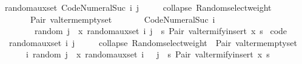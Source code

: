 \begin{isabellebody}
{\isacharbar}{\kern0pt}\ {\isachardoublequoteopen}random{\isacharunderscore}{\kern0pt}aux{\isacharunderscore}{\kern0pt}set\ {\isacharparenleft}{\kern0pt}Code{\isacharunderscore}{\kern0pt}Numeral{\isachardot}{\kern0pt}Suc\ i{\isacharparenright}{\kern0pt}\ j\ {\isacharequal}{\kern0pt}\isanewline
\ \ \ \ collapse\ {\isacharparenleft}{\kern0pt}Random{\isachardot}{\kern0pt}select{\isacharunderscore}{\kern0pt}weight\isanewline
\ \ \ \ \ \ {\isacharbrackleft}{\kern0pt}{\isacharparenleft}{\kern0pt}{}{\isacharcomma}{\kern0pt}\ Pair\ valterm{\isacharunderscore}{\kern0pt}emptyset{\isacharparenright}{\kern0pt}{\isacharcomma}{\kern0pt}\isanewline
\ \ \ \ \ \ \ {\isacharparenleft}{\kern0pt}Code{\isacharunderscore}{\kern0pt}Numeral{\isachardot}{\kern0pt}Suc\ i{\isacharcomma}{\kern0pt}\isanewline
\ \ \ \ \ \ \ \ random\ j\ {\isasymcirc}{\isasymrightarrow}\ {\isacharparenleft}{\kern0pt}{\isacharpercent}{\kern0pt}x{\isachardot}{\kern0pt}\ random{\isacharunderscore}{\kern0pt}aux{\isacharunderscore}{\kern0pt}set\ i\ j\ {\isasymcirc}{\isasymrightarrow}\ {\isacharparenleft}{\kern0pt}{\isacharpercent}{\kern0pt}s{\isachardot}{\kern0pt}\ Pair\ {\isacharparenleft}{\kern0pt}valtermify{\isacharunderscore}{\kern0pt}insert\ x\ s{\isacharparenright}{\kern0pt}{\isacharparenright}{\kern0pt}{\isacharparenright}{\kern0pt}{\isacharparenright}{\kern0pt}{\isacharbrackright}{\kern0pt}{\isacharparenright}{\kern0pt}{\isachardoublequoteclose}\isanewline
\isanewline
{}\isamarkupfalse%
\ {\isacharbrackleft}{\kern0pt}code{\isacharbrackright}{\kern0pt}{\isacharcolon}{\kern0pt}\isanewline
\ \ {\isachardoublequoteopen}random{\isacharunderscore}{\kern0pt}aux{\isacharunderscore}{\kern0pt}set\ i\ j\ {\isacharequal}{\kern0pt}\isanewline
\ \ \ \ collapse\ {\isacharparenleft}{\kern0pt}Random{\isachardot}{\kern0pt}select{\isacharunderscore}{\kern0pt}weight\ {\isacharbrackleft}{\kern0pt}{\isacharparenleft}{\kern0pt}{}{\isacharcomma}{\kern0pt}\ Pair\ valterm{\isacharunderscore}{\kern0pt}emptyset{\isacharparenright}{\kern0pt}{\isacharcomma}{\kern0pt}\isanewline
\ \ \ \ \ \ {\isacharparenleft}{\kern0pt}i{\isacharcomma}{\kern0pt}\ random\ j\ {\isasymcirc}{\isasymrightarrow}\ {\isacharparenleft}{\kern0pt}{\isacharpercent}{\kern0pt}x{\isachardot}{\kern0pt}\ random{\isacharunderscore}{\kern0pt}aux{\isacharunderscore}{\kern0pt}set\ {\isacharparenleft}{\kern0pt}i\ {\isacharminus}{\kern0pt}\ {}{\isacharparenright}{\kern0pt}\ j\ {\isasymcirc}{\isasymrightarrow}\ {\isacharparenleft}{\kern0pt}{\isacharpercent}{\kern0pt}s{\isachardot}{\kern0pt}\ Pair\ {\isacharparenleft}{\kern0pt}valtermify{\isacharunderscore}{\kern0pt}insert\ x\ s{\isacharparenright}{\kern0pt}{\isacharparenright}{\kern0pt}{\isacharparenright}{\kern0pt}{\isacharparenright}{\kern0pt}{\isacharbrackright}{\kern0pt}{\isacharparenright}{\kern0pt}{\isachardoublequoteclose}\isanewline

\end{isabellebody}
